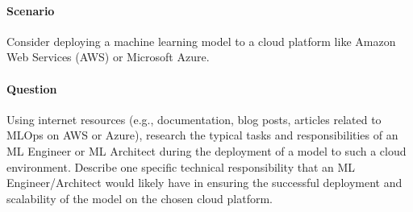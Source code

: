\begin{exerciseboxpaper}

\paragraph*{Scenario}
Consider deploying a machine learning model to a cloud platform like Amazon Web Services (AWS) or Microsoft Azure.

\paragraph*{Question}
Using internet resources (e.g., documentation, blog posts, articles related to MLOps on AWS or Azure), research the typical tasks and responsibilities of an ML Engineer or ML Architect during the deployment of a model to such a cloud environment. Describe one specific technical responsibility that an ML Engineer/Architect would likely have in ensuring the successful deployment and scalability of the model on the chosen cloud platform.
\end{exerciseboxpaper}

